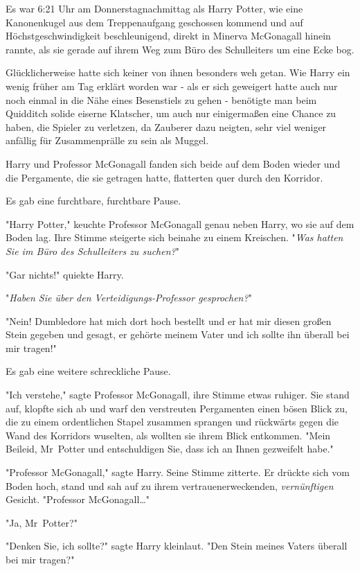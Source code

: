 {Es war 6:21 Uhr am Donnerstagnachmittag als Harry Potter, wie eine Kanonenkugel aus dem Treppenaufgang geschossen kommend und auf Höchstgeschwindigkeit beschleunigend, direkt in Minerva McGonagall hinein rannte, als sie gerade auf ihrem Weg zum Büro des Schulleiters um eine Ecke bog.

Glücklicherweise hatte sich keiner von ihnen besonders weh getan. Wie Harry ein wenig früher am Tag erklärt worden war - als er sich geweigert hatte auch nur noch einmal in die Nähe eines Besenstiels zu gehen - benötigte man beim Quidditch solide eiserne Klatscher, um auch nur einigermaßen eine Chance zu haben, die Spieler zu verletzen, da Zauberer dazu neigten, sehr viel weniger anfällig für Zusammenprälle zu sein als Muggel.

Harry und Professor McGonagall fanden sich beide auf dem Boden wieder und die Pergamente, die sie getragen hatte, flatterten quer durch den Korridor.

Es gab eine furchtbare, furchtbare Pause.

"Harry Potter," keuchte Professor McGonagall genau neben Harry, wo sie auf dem Boden lag. Ihre Stimme steigerte sich beinahe zu einem Kreischen. "\emph{Was hatten Sie im Büro des Schulleiters zu suchen?}"

"Gar nichts!" quiekte Harry.

"\emph{Haben Sie über den Verteidigungs-Professor gesprochen?}"

"Nein! Dumbledore hat mich dort hoch bestellt und er hat mir diesen großen Stein gegeben und gesagt, er gehörte meinem Vater und ich sollte ihn überall bei mir tragen!"

Es gab eine weitere schreckliche Pause.

"Ich verstehe," sagte Professor McGonagall, ihre Stimme etwas ruhiger. Sie stand auf, klopfte sich ab und warf den verstreuten Pergamenten einen bösen Blick zu, die zu einem ordentlichen Stapel zusammen sprangen und rückwärts gegen die Wand des Korridors wuselten, als wollten sie ihrem Blick entkommen. "Mein Beileid, Mr~Potter und entschuldigen Sie, dass ich an Ihnen gezweifelt habe."

"Professor McGonagall," sagte Harry. Seine Stimme zitterte. Er drückte sich vom Boden hoch, stand und sah auf zu ihrem vertrauenerweckenden, \emph{vernünftigen} Gesicht. "Professor McGonagall…"

"Ja, Mr~Potter?"

"Denken Sie, ich sollte?" sagte Harry kleinlaut. "Den Stein meines Vaters überall bei mir tragen?"

}
